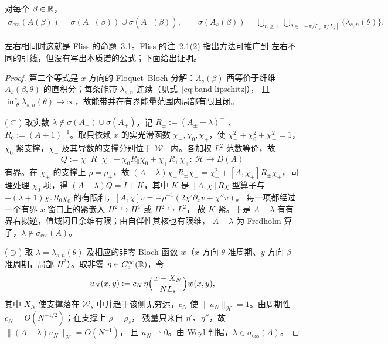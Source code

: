 \begin{proposition}[两条引线时的本质谱]
  \label{prop:essential-spectrum}
  对每个 $\beta\in\mathbb{R}$，
  \begin{align}
    \sigma_{\mathrm{ess}}(A(\beta))
    =\sigma(A_-(\beta))\cup\sigma(A_+(\beta)),\qquad
    \sigma(A_s(\beta))
    =\bigcup_{n\geq1}\ \bigcup_{\theta\in[-\pi/L_s,\pi/L_s]}\{\lambda_{s,n}(\theta)\}.
    \label{eq:essential-spectrum}
  \end{align}
\end{proposition}

左右相同时这就是 Fliss 的命题~3.1\cite{Fliss2013}。Fliss 的注~2.1(2) 指出方法可推广到
左右不同的引线，但没有写出本质谱的公式；下面给出证明。

\begin{proof}
  第二个等式是 $x$ 方向的 Floquet--Bloch 分解：$A_s(\beta)$ 酉等价于纤维
  $A_s(\beta,\theta)$ 的直积分；每条能带 $\lambda_{s,n}$ 连续（见式~\eqref{eq:band-lipschitz}），
  且 $\inf_\theta\lambda_{s,n}(\theta)\to\infty$，故能带并在有界能量范围内局部有限且闭。

  ($\subset$) 取实数 $\lambda\notin\sigma(A_-)\cup\sigma(A_+)$，记
  $R_\pm:=(A_\pm-\lambda)^{-1}$、$R_0:=(A+1)^{-1}$。取只依赖 $x$ 的实光滑函数
  $\chi_-,\chi_0,\chi_+$，使 $\chi_-^2+\chi_0^2+\chi_+^2=1$，$\chi_0$ 紧支撑，$\chi_\pm$
  及其导数的支撑分别位于 $\mathcal W_\pm$ 内。各加权 $L^2$ 范数等价，故
  \[
    Q:=\chi_-R_-\chi_-+\chi_0R_0\chi_0+\chi_+R_+\chi_+:\ \mathcal H\to D(A)
  \]
  有界。在 $\chi_\pm$ 的支撑上 $\rho=\rho_\pm$，故 $(A-\lambda)\chi_\pm R_\pm\chi_\pm
  =\chi_\pm^2+[A,\chi_\pm]R_\pm\chi_\pm$，同理处理 $\chi_0$ 项，得
  $(A-\lambda)Q=I+K$，其中 $K$ 是 $[A,\chi]R\chi$ 型算子与
  $-(\lambda+1)\chi_0R_0\chi_0$ 的有限和，$[A,\chi]v=-\rho^{-1}(2\chi'\partial_xv+\chi''v)$。
  每一项都经过一个有界 $x$ 窗口上的紧嵌入 $H^2\hookrightarrow H^1$ 或 $H^2\hookrightarrow L^2$，
  故 $K$ 紧。于是 $A-\lambda$ 有有界右拟逆，值域闭且余维有限；由自伴性其核也有限维，
  $A-\lambda$ 为 Fredholm 算子，$\lambda\notin\sigma_{\mathrm{ess}}(A)$。

  ($\supset$) 取 $\lambda=\lambda_{s,n}(\theta)$ 及相应的非零 Bloch 函数 $w$（$x$ 方向
  $\theta$ 准周期、$y$ 方向 $\beta$ 准周期，局部 $H^2$）。取非零 $\eta\in C_c^\infty(\mathbb{R})$，令
  \[
    u_N(x,y):=c_N\,\eta\Bigl(\frac{x-X_N}{NL_s}\Bigr)w(x,y),
  \]
  其中 $X_N$ 使支撑落在 $\mathcal W_s$ 中并趋于该侧无穷远，$c_N$ 使
  $\lVert u_N\rVert_{\mathcal H}=1$。由周期性 $c_N=O(N^{-1/2})$；在支撑上 $\rho=\rho_s$，
  残量只来自 $\eta'$、$\eta''$，故 $\lVert(A-\lambda)u_N\rVert_{\mathcal H}=O(N^{-1})$，
  且 $u_N\rightharpoonup0$。由 Weyl 判据，$\lambda\in\sigma_{\mathrm{ess}}(A)$。
\end{proof}


